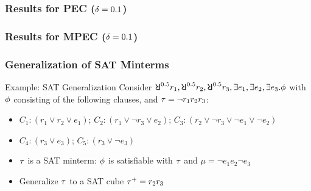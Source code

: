 \begin{frame}
    \frametitle{Results for PEC ($\delta=0.1$)}
    \begin{table}
        \centering
        \tiny
    \end{table}
\end{frame}

\begin{frame}
    \frametitle{Results for MPEC ($\delta=0.1$)}
    \begin{table}
        \centering
        \tiny
    \end{table}
\end{frame}

\begin{frame}
    \frametitle{Generalization of SAT Minterms}
    \begin{block}{Example: SAT Generalization}
        Consider $\random{0.5}r_1,\random{0.5}r_2,\random{0.5}r_3,\exists e_1,\exists e_2,\exists e_3.\pf$ with $\phi$ consisting of the following clauses, and $\tau=\lnot r_1r_2r_3$:
        \begin{itemize}
            \item[] $C_1: (r_1 \lor r_2 \lor e_1)$; $C_2: (r_1 \lor \lnot r_3 \lor e_2)$; $C_3: (r_2 \lor \lnot r_3 \lor \lnot e_1 \lor \lnot e_2)$
            \item[] $C_4: (r_3 \lor e_3)$; $C_5: (r_3 \lor \lnot e_3)$
        \end{itemize}
        \begin{itemize}
            \item $\tau$ is a SAT minterm: $\phi$ is satisfiable with $\tau$ and $\mu=\lnot e_1e_2\lnot e_3$
            \item Generalize $\tau$ to a SAT cube $\tau^+=r_2r_3$
        \end{itemize}
    \end{block}
\end{frame}

